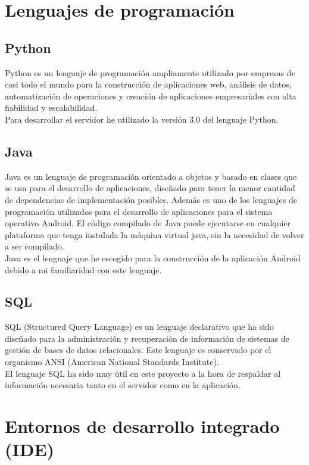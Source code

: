 \section{Lenguajes de programación}

\subsection{Python}

Python es un lenguaje de programación ampliamente utilizado por empresas de casi todo el mundo para la construcción de aplicaciones web, análisis de datos, automatización de operaciones y creación de aplicaciones empresariales con alta fiabilidad y escalabilidad.\\
Para desarrollar el servidor he utilizado la versión 3.0 del lenguaje Python.

\subsection{Java}

Java es un lenguaje de programación orientado a objetos y basado en clases que se usa para el desarrollo de aplicaciones, diseñado para tener la menor cantidad de dependencias de implementación posibles. Además es uno de los lenguajes de programación utilizados para el desarrollo de aplicaciones para el sistema operativo Android. El código compilado de Java puede ejecutarse en cualquier plataforma que tenga instalada la máquina virtual java, sin la necesidad de volver a ser compilado.\\
Java es el lenguaje que he escogido para la construcción de la aplicación Android debido a mi familiaridad con este lenguaje.

\subsection{SQL}

SQL (Structured Query Language) es un lenguaje declarativo que ha sido diseñado para la administración y recuperación de información de sistemas de gestión de bases de datos relacionales. Este lenguaje es conservado por el organismo ANSI (American National Standards Institute).\\
El lenguaje SQL ha sido muy útil en este proyecto a la hora de respaldar al información necesaria tanto en el servidor como en la aplicación.



\section{Entornos de desarrollo integrado (IDE)}

